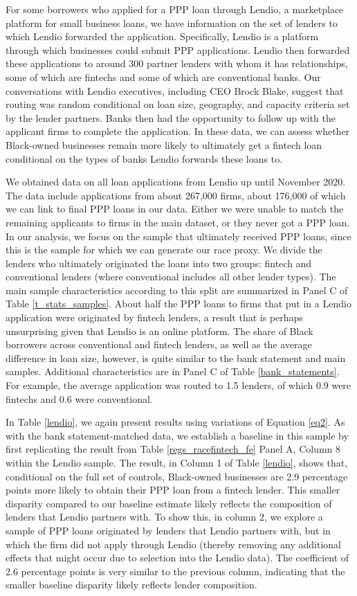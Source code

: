 \documentclass[11pt]{article}
\begin{document}
For some borrowers who applied for a PPP loan through Lendio, a marketplace platform for small business loans, we have information on the set of lenders to which Lendio forwarded the application. Specifically, Lendio is a platform through which businesses could submit PPP applications. Lendio then forwarded these applications to around 300 partner lenders with whom it has relationships, some of which are fintechs and some of which are conventional banks. Our conversations with Lendio executives, including CEO Brock Blake, suggest that routing was random conditional on loan size, geography, and capacity criteria set by the lender partners. Banks then had the opportunity to follow up with the applicant firms to complete the application. In these data, we can assess whether Black-owned businesses remain more likely to ultimately get a fintech loan conditional on the types of banks Lendio forwards these loans to.

We obtained data on all loan applications from Lendio up until November 2020. The data include applications from about 267,000 firms, about 176,000 of which we can link to final PPP loans in our data. Either we were unable to match the remaining applicants to firms in the main dataset, or they never got a PPP loan. In our analysis, we focus on the sample that ultimately received PPP loans, since this is the sample for which we can generate our race proxy. We divide the lenders who ultimately originated the loans into two groups: fintech and conventional lenders (where conventional includes all other lender types). The main sample characteristics according to this split are summarized in Panel C of Table \ref{t_stats_samples}. About half the PPP loans to firms that put in a Lendio application were originated by fintech lenders, a result that is perhaps unsurprising given that Lendio is an online platform. The share of Black borrowers across conventional and fintech lenders, as well as the average difference in loan size, however, is quite similar to the bank statement and main samples. Additional characteristics are in Panel C of Table \ref{bank_statements}. For example, the average application was routed to 1.5 lenders, of which 0.9 were fintechs and 0.6 were conventional.

In Table \ref{lendio}, we again present results using variations of Equation \ref{eq2}. As with the bank statement-matched  data, we establish a baseline in this sample by first replicating the result from Table \ref{regs_racefintech_fe} Panel A, Column 8 within the Lendio sample. The result, in Column 1 of Table \ref{lendio}, shows that, conditional on the full set of controls, Black-owned businesses are 2.9 percentage points more likely to obtain their PPP loan from a fintech lender. This smaller disparity compared to our baseline estimate likely reflects the composition of lenders that Lendio partners with. To show this, in column 2, we explore a sample of PPP loans originated by lenders that Lendio partners with, but in which the firm did not apply through Lendio (thereby removing any additional effects that might occur due to selection into the Lendio data). The coefficient of 2.6 percentage points is very similar to the previous column, indicating that the smaller baseline disparity likely reflects lender composition.
\end{document}
